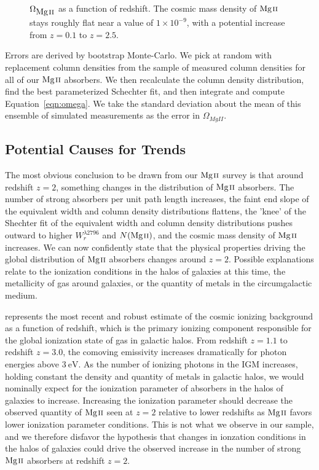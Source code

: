 \documentclass[iop,apj,numberedappendix,appendixfloats,twocolappendix]{emulateapj}
\begin{document}
\begin{figure*}[bth]
\caption{$\Omega_{\hbox{{\rm Mg}\kern 0.1em{\sc ii}}}$ as a function of redshift. The cosmic mass density of ${\hbox{{\rm Mg}\kern 0.1em{\sc ii}}}$ stays roughly flat near a value of $1 \times 10^{-9}$, with a potential increase from $z = 0.1$ to $z = 2.5$.}
\label{fig:omegamgii}
\end{figure*}

Errors are derived by bootstrap Monte-Carlo. We pick at random with replacement column densities from the sample of measured column densities for all of our ${\hbox{{\rm Mg}\kern 0.1em{\sc ii}}}$ absorbers. We then recalculate the column density distribution, find the best parameterized Schechter fit, and then integrate and compute Equation~\ref{eqn:omega}. We take the standard deviation about the mean of this ensemble of simulated measurements as the error in $\Omega_{MgII}$. 

\subsection{Potential Causes for Trends}
\label{trendcauses}

The most obvious conclusion to be drawn from our ${\hbox{{\rm Mg}\kern 0.1em{\sc ii}}}$ survey is that around redshift $z = 2$, something changes in the distribution of ${\hbox{{\rm Mg}\kern 0.1em{\sc ii}}}$ absorbers. The number of strong absorbers per unit path length increases, the faint end slope of the equivalent width and column density distributions flattens, the 'knee' of the Shechter fit of the equivalent width and column density distributions pushes outward to higher $W_r^{\lambda2796}$ and $N(\hbox{{\rm Mg}\kern 0.1em{\sc ii}})$, and the cosmic mass density of ${\hbox{{\rm Mg}\kern 0.1em{\sc ii}}}$ increases. We can now confidently state that the physical properties driving the global distribution of ${\hbox{{\rm Mg}\kern 0.1em{\sc ii}}}$ absorbers changes around $z = 2$. Possible explanations relate to the ionization conditions in the halos of galaxies at this time, the metallicity of gas around galaxies, or the quantity of metals in the circumgalactic medium.

\cite{Haardt2012} represents the most recent and robust estimate of the cosmic ionizing background as a function of redshift, which is the primary ionizing component responsible for the global ionization state of gas in galactic halos. From redshift $z = 1.1$ to redshift $z = 3.0$, the comoving emissivity increases dramatically for photon energies above $3~\mathrm{eV}$. As the number of ionizing photons in the IGM increases, holding constant the density and quantity of metals in galactic halos, we would nominally expect for the ionization parameter of absorbers in the halos of galaxies to increase. Increasing the ionization parameter should decrease the observed quantity of ${\hbox{{\rm Mg}\kern 0.1em{\sc ii}}}$ seen at $z = 2$ relative to lower redshifts as ${\hbox{{\rm Mg}\kern 0.1em{\sc ii}}}$ favors lower ionization parameter conditions. This is not what we observe in our sample, and we therefore disfavor the hypothesis that changes in ionzation conditions in the halos of galaxies could drive the observed increase in the number of strong ${\hbox{{\rm Mg}\kern 0.1em{\sc ii}}}$ absorbers at redshift $z = 2$. 
\end{document}
